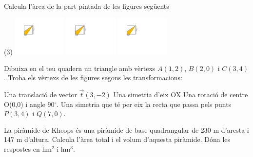 \begin{mylist}
\exer[2] Calcula l'àrea de la part pintada de les figures següents
\begin{tasks}(3)
	\task \includegraphics[width=0.2\textwidth, page=1]{img-12/arees}
	\task \includegraphics[width=0.2\textwidth, page=2]{img-12/arees}
	\task \includegraphics[width=0.2\textwidth, page=3]{img-12/arees}
\end{tasks}


\exer[2] Dibuixa en el teu quadern un triangle amb vèrtexs $A(1, 2)$, $B(2, 0)$ i $C(3, 4)$. Troba els vèrtexs de les figures segons les transformacions:
\begin{tasks}
	\task Una translació de vector $\vec t(3,-2)$
	\task Una simetria d'eix OX
	\task Una rotació de centre O(0,0) i angle 90$^\circ$.
	\task Una simetria que té per eix la recta que passa pels punts $P(3, 4)$ i $Q(7, 0)$.
\end{tasks}
\answers[cols=1]{[$A'(4,0)$ $B'(5,-2)$  $C'(6,2)$, $A'(1,-2)$ $B'(2,0)$ $C'(3,-4)$, $A'(-2,1)$ $B'(0,2)$ $C'(-4,3)$, $A'(5,6)$ $B'(7,5)$ $C'(3,4)$]}

\exer[2] La piràmide de Kheops és una piràmide de base quadrangular de 230 m d'aresta i 147 m d'altura. Calcula l'àrea total i el volum d'aquesta piràmide. Dóna les respostes en hm$^2$ i hm$^3$.


\end{mylist}
